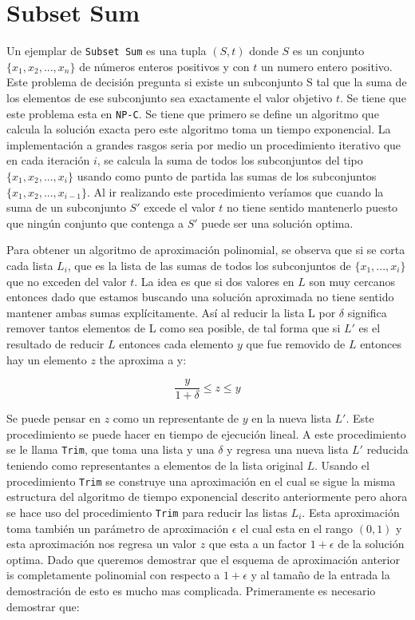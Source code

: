 \documentclass{article}
\begin{document}
\section{Subset Sum}
Un ejemplar de \texttt{Subset Sum} es una tupla $(S, t)$ donde $S$ es un conjunto $\{ x_1, x_2, ..., x_n\}$ de números enteros positivos y con $t$ un numero entero positivo. Este problema de decisión pregunta si existe un subconjunto S tal que la suma de los elementos de ese subconjunto sea exactamente el valor objetivo $t$. Se tiene que este problema esta en \verb;NP-C;. Se tiene que primero se define un algoritmo que calcula la solución exacta pero este algoritmo toma un tiempo exponencial. La implementación a grandes rasgos seria por medio un procedimiento iterativo que en cada iteración $i$, se calcula la suma de todos los subconjuntos del tipo $\{ x_1, x_2, ..., x_i\}$ usando como punto de partida las sumas de los subconjuntos $\{ x_1, x_2, ..., x_{i-1}\}$. Al ir realizando este procedimiento veríamos que cuando la suma de un subconjunto $S'$ excede el valor $t$ no tiene sentido mantenerlo puesto que ningún conjunto que contenga a $S'$ puede ser una solución optima.

Para obtener un algoritmo de aproximación polinomial, se observa que si se corta cada lista $L_i$, que es la lista de las sumas de todos los subconjuntos de $\{ x_1, ..., x_i\}$ que no exceden del valor $t$. La idea es que si dos valores en $L$ son muy cercanos entonces dado que estamos buscando una solución aproximada no tiene sentido mantener ambas sumas explícitamente. Así al reducir la lista L por $\delta$ significa remover tantos elementos de L como sea posible, de tal forma que si $L'$ es el resultado de reducir $L$ entonces cada elemento $y$ que fue removido de $L$ entonces hay un elemento $z$ the aproxima a y:

  \begin{equation*}
    \frac{y}{1 + \delta} \leq z \leq y
  \end{equation*}

  Se puede pensar en $z$ como un representante de $y$ en la nueva lista $L'$. Este procedimiento se puede hacer en tiempo de ejecución lineal. A este procedimiento se le llama \texttt{Trim}, que toma una lista y una $\delta$ y regresa una nueva lista $L'$ reducida teniendo como representantes a elementos de la lista original $L$. Usando el procedimiento \texttt{Trim} se construye una aproximación en el cual se sigue la misma estructura del algoritmo de tiempo exponencial descrito anteriormente pero ahora se hace uso del procedimiento \texttt{Trim} para reducir las listas $L_i$. Esta aproximación toma también un parámetro de aproximación $\epsilon$ el cual esta en el rango $(0,1)$ y esta aproximación nos regresa un valor $z$ que esta a un factor $1 + \epsilon$ de la solución optima. Dado que queremos demostrar que el esquema de aproximación anterior is completamente polinomial con respecto a $1 + \epsilon$ y al tamaño de la entrada la demostración de esto es mucho mas complicada. Primeramente es necesario demostrar que:
  
\end{document}

